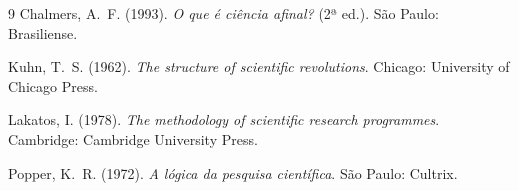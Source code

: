 \documentclass[9pt,a4paper]{extarticle}
\theoremstyle{definition}
\begin{document}
\begin{thebibliography}{9}
Chalmers, A.\ F. (1993).
\newblock \emph{O que é ciência afinal?} (2ª ed.).
\newblock São Paulo: Brasiliense.

Kuhn, T.\ S. (1962).
\newblock \emph{The structure of scientific revolutions}.
\newblock Chicago: University of Chicago Press.

Lakatos, I. (1978).
\newblock \emph{The methodology of scientific research programmes}.
\newblock Cambridge: Cambridge University Press.

Popper, K.\ R. (1972).
\newblock \emph{A lógica da pesquisa científica}.
\newblock São Paulo: Cultrix.
\end{thebibliography}
\end{document}
